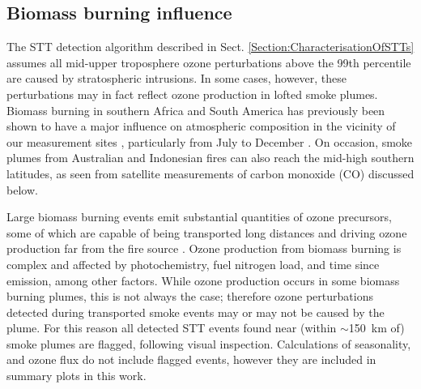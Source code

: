 \documentclass[acp, manuscript]{copernicus} %
\begin{document}
  \subsection{Biomass burning influence}
  \label{Section:BiomassBurning}
    The STT detection algorithm described in Sect. \ref{Section:CharacterisationOfSTTs} assumes all mid-upper troposphere ozone perturbations above the 99th percentile are caused by stratospheric intrusions. 
    In some cases, however, these perturbations may in fact reflect ozone production in lofted smoke plumes.
    Biomass burning in southern Africa and South America has previously been shown to have a major influence on atmospheric composition in the vicinity of our measurement sites \citep{Oltmans2001, Gloudemans2006, Edwards2006}, particularly from July to December \citep{Pak2003, Liu2016}.
    On occasion, smoke plumes from Australian and Indonesian fires can also reach the mid-high southern latitudes, as seen from satellite measurements of carbon monoxide (CO) discussed below. %
    
    Large biomass burning events emit substantial quantities of ozone precursors, some of which are capable of being transported long distances and driving ozone production far from the fire source \citep{Jaffe2012}.
    Ozone production from biomass burning is complex and affected by photochemistry, fuel nitrogen load, and time since emission, among other factors. 
    While ozone production occurs in some biomass burning plumes, this is not always the case; therefore ozone perturbations detected during transported smoke events may or may not be caused by the plume.
    For this reason all detected STT events found near (within $\sim$150~km of) smoke plumes are flagged, following visual inspection.
    Calculations of seasonality, and ozone flux do not include flagged events, however they are included in summary plots in this work.
    
    
\end{document}
